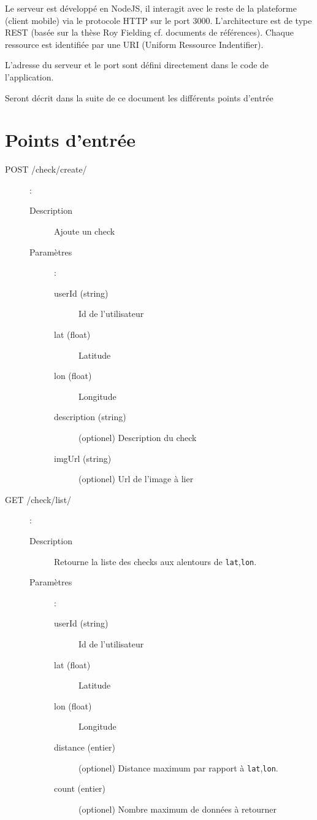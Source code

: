 \documentclass[a4paper,12pt]{report}
\begin{document}
\begin{onehalfspace}
Le serveur est développé en NodeJS, il interagit avec le reste de la plateforme (client mobile) via le protocole HTTP sur le port 3000. L'architecture est de type REST (basée sur la thèse Roy Fielding cf. documents de références). Chaque ressource est identifiée par une URI (Uniform Ressource Indentifier).

L'adresse du serveur et le port sont défini directement dans le code de l'application.

Seront décrit dans la suite de ce document les différents points d'entrée

\section{Points d'entrée}
\begin{description}
  \item[POST /check/create/]:

    \begin{description}
      \item[Description] Ajoute un check
      \item[Paramètres]:

        \begin{description}
          \item[userId (string)] Id de l'utilisateur
          \item[lat (float)] Latitude
          \item[lon (float)] Longitude
          \item[description (string)] (optionel) Description du check
          \item[imgUrl (string)] (optionel) Url de l'image à lier
        \end{description}
    \end{description}

  \item[GET /check/list/]:

    \begin{description}
      \item[Description] Retourne la liste des checks aux alentours de \lstinline{lat},\lstinline{lon}.

      \item[Paramètres]:
        \begin{description}
          \item[userId (string)] Id de l'utilisateur
          \item[lat (float)] Latitude
          \item[lon (float)] Longitude
          \item[distance (entier)] (optionel) Distance maximum par rapport à \lstinline{lat},\lstinline{lon}.
          \item[count (entier)] (optionel) Nombre maximum de données à retourner
        \end{description}
    \end{description}


\end{description}
\end{onehalfspace}
\end{document}
